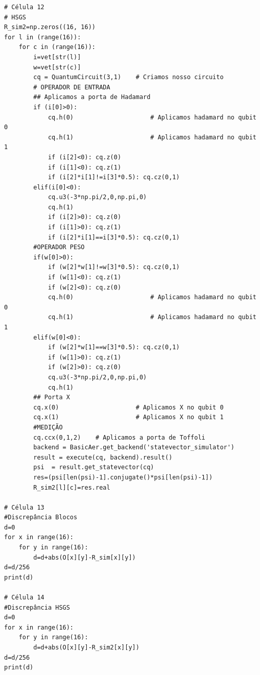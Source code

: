 \begin{verbatim}
# Célula 12
# HSGS
R_sim2=np.zeros((16, 16))
for l in (range(16)):
    for c in (range(16)):
        i=vet[str(l)]
        w=vet[str(c)]
        cq = QuantumCircuit(3,1)    # Criamos nosso circuito        
        # OPERADOR DE ENTRADA
        ## Aplicamos a porta de Hadamard
        if (i[0]>0):        
            cq.h(0)                     # Aplicamos hadamard no qubit 0
            cq.h(1)                     # Aplicamos hadamard no qubit 1        
            if (i[2]<0): cq.z(0)
            if (i[1]<0): cq.z(1)
            if (i[2]*i[1]!=i[3]*0.5): cq.cz(0,1) 
        elif(i[0]<0):
            cq.u3(-3*np.pi/2,0,np.pi,0)
            cq.h(1)            
            if (i[2]>0): cq.z(0)
            if (i[1]>0): cq.z(1)
            if (i[2]*i[1]==i[3]*0.5): cq.cz(0,1) 
        #OPERADOR PESO
        if(w[0]>0):
            if (w[2]*w[1]!=w[3]*0.5): cq.cz(0,1) 
            if (w[1]<0): cq.z(1)
            if (w[2]<0): cq.z(0)
            cq.h(0)                     # Aplicamos hadamard no qubit 0
            cq.h(1)                     # Aplicamos hadamard no qubit 1
        elif(w[0]<0):
            if (w[2]*w[1]==w[3]*0.5): cq.cz(0,1) 
            if (w[1]>0): cq.z(1)
            if (w[2]>0): cq.z(0)
            cq.u3(-3*np.pi/2,0,np.pi,0)
            cq.h(1)
        ## Porta X
        cq.x(0)                     # Aplicamos X no qubit 0
        cq.x(1)                     # Aplicamos X no qubit 1
        #MEDIÇÃO
        cq.ccx(0,1,2)    # Aplicamos a porta de Toffoli
        backend = BasicAer.get_backend('statevector_simulator')    
        result = execute(cq, backend).result()                   
        psi  = result.get_statevector(cq)                        
        res=(psi[len(psi)-1].conjugate()*psi[len(psi)-1])
        R_sim2[l][c]=res.real

# Célula 13
#Discrepância Blocos
d=0
for x in range(16):
    for y in range(16):
        d=d+abs(O[x][y]-R_sim[x][y])
d=d/256
print(d)

# Célula 14
#Discrepância HSGS
d=0
for x in range(16):
    for y in range(16):
        d=d+abs(O[x][y]-R_sim2[x][y])
d=d/256
print(d)
\end{verbatim}
